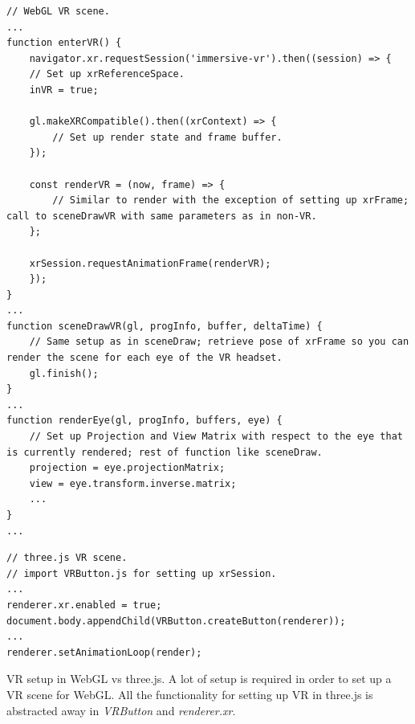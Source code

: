 \begin{listing}[H]
\begin{verbatim}
// WebGL VR scene.
...
function enterVR() {
	navigator.xr.requestSession('immersive-vr').then((session) => {
	// Set up xrReferenceSpace.
	inVR = true;

	gl.makeXRCompatible().then((xrContext) => {
		// Set up render state and frame buffer.
	});

	const renderVR = (now, frame) => {
		// Similar to render with the exception of setting up xrFrame; call to sceneDrawVR with same parameters as in non-VR.
	};

	xrSession.requestAnimationFrame(renderVR);
	});
}
...
function sceneDrawVR(gl, progInfo, buffer, deltaTime) {
	// Same setup as in sceneDraw; retrieve pose of xrFrame so you can render the scene for each eye of the VR headset.
	gl.finish();
}
...
function renderEye(gl, progInfo, buffers, eye) {
	// Set up Projection and View Matrix with respect to the eye that is currently rendered; rest of function like sceneDraw.
	projection = eye.projectionMatrix;
	view = eye.transform.inverse.matrix;
	...
}
...
\end{verbatim}
\begin{verbatim}
// three.js VR scene.
// import VRButton.js for setting up xrSession.
...
renderer.xr.enabled = true;
document.body.appendChild(VRButton.createButton(renderer));
...
renderer.setAnimationLoop(render);
\end{verbatim}
\caption{VR setup in WebGL vs three.js. A lot of setup is required in order to set up a VR scene for WebGL. All the functionality for setting up VR in three.js is abstracted away in \textit{VRButton} and \textit{renderer.xr}.}
\label{sec:visualconcepts:virtualreality:vrex}
\end{listing}